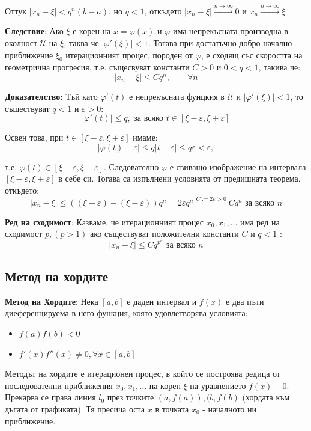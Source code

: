 \documentclass{article}
\renewcommand{\\}{\newline}
\newcommand{\doc}{\textbf{Доказателство: }}
\begin{document}
Оттук \(|x_n - \xi| < q^{n}(b-a)\), но \(q < 1\), откъдето \(|x_{n}  - \xi| \overset{n \to \infty}{\to} 0\) и \(x_{n} \overset{n \to \infty}{\to} \xi\)    

\textbf{Следствие}: Ако \(\xi\) е корен на \(x = \varphi(x)\) и \(\varphi\) има непрекъсната производна в околност \(\mathcal{U}\) на \(\xi\), таква че \(|\varphi'(\xi)| < 1\). Тогава при достатъчно добро начално приближение \(\xi_0\) итерационният процес, породен от \(\varphi\), е сходящ със скоростта на геометрична прогресия, т.е. същесвуват константи \(C > 0\) и \(0 < q < 1\), такива че: \[
  |x_{n} - \xi| \leq Cq^{n},\qquad \forall n
\]          

\doc Тъй като \(\varphi'(t)\) е непрекъсната фунцкия в \(\mathcal{U}\) и \(|\varphi'(\xi)| < 1\), то съществуват \(q < 1\) и \(\varepsilon > 0\): \[
  |\varphi'(t)| \leq q, \text{ за всяко }t \in [\xi - \varepsilon, \xi + \varepsilon]
\]     

Освен това, при \(t \in [\xi - \varepsilon, \xi + \varepsilon]\) имаме: \[
  |\varphi(t) - \varepsilon| \leq q |t - \varepsilon| \leq q \varepsilon < \varepsilon,
\] 

т.е. \(\varphi(t) \in [\xi - \varepsilon, \xi + \varepsilon]\). Следователно \(\varphi\) е свиващо изображение на интервала \([\xi - \varepsilon, \xi + \varepsilon]\) в себе си. Тогава са изпълнени условията от предишната теорема, откъдето: \[
  |x_{n} - \xi| \leq ((\xi + \varepsilon) - (\xi - \varepsilon))q^{n} = 2 \varepsilon q^{n} \overset{C := 2 \varepsilon > 0}{=} Cq^{n} \text{ за всяко }n 
\] 

\textbf{Ред на сходимост}: Казваме, че итерационният процес \(x_0, x_1, ...\) има ред на сходимост \(p, (p>1)\) ако съществуват положителни константи \(C\) и \(q < 1\) : \[
  |x_{n} - \xi| \leq Cq^{p^{n}} \text{ за всяко }n
\]     

\subsection{Метод на хордите}

\textbf{Метод на Хордите}: Нека \([a, b]\) е даден интервал и \(f(x)\) е два пъти диеференцируема в него функция, която удовлетворява условията: \begin{itemize}
    \item \(f(a)f(b) < 0\) 
    \item \(f'(x)f''(x) \not= 0, \forall x \in [a, b]\)  
\end{itemize}  

Методът на хордите е итерационен процес, в който се построява редица от последователни приближения \(x_0, x_1, ...\) на корен \(\xi\) на уравнението \(f(x) - 0\). Прекарва се права линия \(l_{0}\) през точките \((a, f(a)), (b, f(b)\) (хордата към дъгата от графиката). Тя пресича оста \(x\) в точката \(x_0\) - началното ни приближение.   
\end{document}
